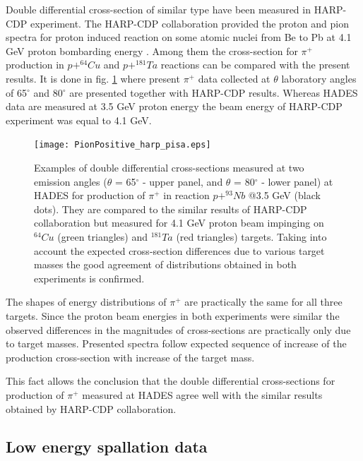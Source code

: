 Double differential cross-section of similar type have been 
measured in HARP-CDP experiment.  %
The HARP-CDP collaboration provided the proton and pion spectra for proton induced reaction on some atomic nuclei from Be to Pb 
at 4.1 GeV proton bombarding energy  \cite{HARP_CDP_Be1_2009,HARP_CDP_Be2_2009,HARP_CDP_Ta_2009,HARP_CDP_Cu_2009,HARP_CDP_C_2010,HARP_CDP_Sn_2011,HARP_CDP_Al_2012}
. 
Among them the cross-section 
for $\pi^{+}$ production in $p + ^{64}Cu$ \cite{HARP_CDP_Cu_2009} and $p + ^{181}Ta$ \cite{HARP_CDP_Ta_2009} reactions can be compared with the present results. It is done in fig. \ref{Comp_HARP_pip} where 
present $\pi^{+}$ data collected at $\theta$ laboratory 
angles of 65$^{\circ}$ and 80$^{\circ}$ are presented together with   
HARP-CDP results. Whereas HADES data are measured at 3.5 GeV proton energy the beam energy of HARP-CDP experiment was equal to 4.1 GeV.

\begin{figure}[!ht]
    \centering
	\texttt{[image: PionPositive\_harp\_pisa.eps]}%
	\caption{\label{Comp_HARP_pip} 
		Examples of double differential cross-sections measured at two emission angles 
		($\theta$ = 65$^{\circ}$ - upper panel, and $\theta$ = 80$^{\circ}$ - lower panel) 
		at HADES for production of $\pi^{+}$ in reaction $p+^{93}Nb$ @3.5 GeV (black dots). 
		They are compared to the similar results of HARP-CDP collaboration but measured for 4.1 GeV proton 
		beam impinging on $^{64}Cu$ (green triangles) \cite{HARP_CDP_Cu_2009} and $^{181}Ta$ 
		(red triangles) \cite{HARP_CDP_Ta_2009} targets.
		Taking into account the expected cross-section differences due to various target masses 
		the good agreement of distributions obtained in both experiments is confirmed.
	}
\end{figure}

The shapes of energy distributions of $\pi^{+}$  
are practically the same for all three targets.
Since the proton beam energies in both experiments were similar the observed differences in the magnitudes of cross-sections are practically only due to target masses. Presented spectra   
follow expected sequence of increase of the production cross-section with increase of the target mass. 

This fact allows the conclusion that 
the double differential cross-sections for production of $\pi^{+}$ measured at HADES agree 
well with the similar results obtained by HARP-CDP collaboration.


\subsection{\label{spal_data} Low energy spallation data}

